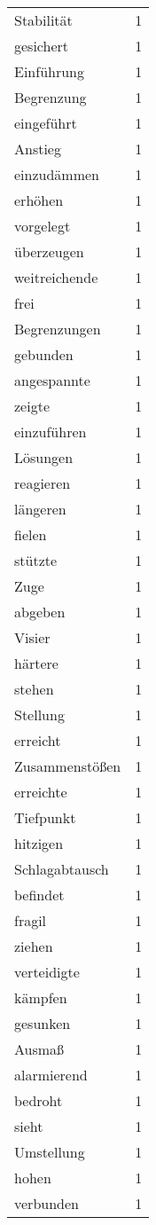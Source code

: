 \begin{tabular}{lr}
Stabilität & 1 \\
gesichert & 1 \\
Einführung & 1 \\
Begrenzung & 1 \\
eingeführt & 1 \\
Anstieg & 1 \\
einzudämmen & 1 \\
erhöhen & 1 \\
vorgelegt & 1 \\
überzeugen & 1 \\
weitreichende & 1 \\
frei & 1 \\
Begrenzungen & 1 \\
gebunden & 1 \\
angespannte & 1 \\
zeigte & 1 \\
einzuführen & 1 \\
Lösungen & 1 \\
reagieren & 1 \\
längeren & 1 \\
fielen & 1 \\
stützte & 1 \\
Zuge & 1 \\
abgeben & 1 \\
Visier & 1 \\
härtere & 1 \\
stehen & 1 \\
Stellung & 1 \\
erreicht & 1 \\
Zusammenstößen & 1 \\
erreichte & 1 \\
Tiefpunkt & 1 \\
hitzigen & 1 \\
Schlagabtausch & 1 \\
befindet & 1 \\
fragil & 1 \\
ziehen & 1 \\
verteidigte & 1 \\
kämpfen & 1 \\
gesunken & 1 \\
Ausmaß & 1 \\
alarmierend & 1 \\
bedroht & 1 \\
sieht & 1 \\
Umstellung & 1 \\
hohen & 1 \\
verbunden & 1 \\

\end{tabular}
